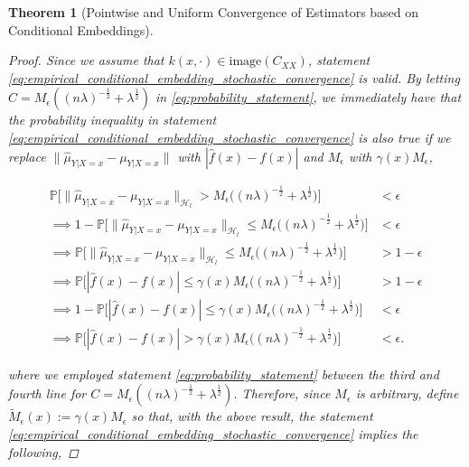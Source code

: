\documentclass{article}
\newtheorem{theorem}{Theorem}[section]
\begin{document}
\begin{theorem}[Pointwise and Uniform Convergence of Estimators based on Conditional Embeddings]
\begin{proof}
			Since we assume that $k(x, \cdot) \in \mathrm{image}(C_{XX})$, statement \eqref{eq:empirical_conditional_embedding_stochastic_convergence} is valid. By letting $C = M_{\epsilon} ((n \lambda)^{-\frac{1}{2}} + \lambda^{\frac{1}{2}})$ in \eqref{eq:probability_statement}, we immediately have that the probability inequality in statement \eqref{eq:empirical_conditional_embedding_stochastic_convergence} is also true if we replace $\| \hat{\mu}_{Y | X = x} - \mu_{Y | X = x} \|$ with $| \hat{f}(x) - f(x) |$ and $M_{\epsilon}$ with $\gamma(x) M_{\epsilon}$,
			
			\begin{equation}
			\begin{aligned}
			\mathbb{P}\Big[\big\| \hat{\mu}_{Y | X = x} - \mu_{Y | X = x} \big\|_{\mathcal{H}_{l}} > M_{\epsilon} \Big((n \lambda)^{-\frac{1}{2}} + \lambda^{\frac{1}{2}}\Big)\Big] &< \epsilon \\
			\implies 1 - \mathbb{P}\Big[\big\| \hat{\mu}_{Y | X = x} - \mu_{Y | X = x} \big\|_{\mathcal{H}_{l}} \leq M_{\epsilon} \Big((n \lambda)^{-\frac{1}{2}} + \lambda^{\frac{1}{2}}\Big)\Big] &< \epsilon \\
			\implies \mathbb{P}\Big[\big\| \hat{\mu}_{Y | X = x} - \mu_{Y | X = x} \big\|_{\mathcal{H}_{l}} \leq M_{\epsilon} \Big((n \lambda)^{-\frac{1}{2}} + \lambda^{\frac{1}{2}}\Big)\Big] &> 1 -  \epsilon \\
			\implies \mathbb{P}\Big[| \hat{f}(x) - f(x) | \leq \gamma(x) M_{\epsilon} \Big((n \lambda)^{-\frac{1}{2}} + \lambda^{\frac{1}{2}}\Big)\Big] &> 1 -  \epsilon \\
			\implies 1 - \mathbb{P}\Big[| \hat{f}(x) - f(x) | \leq \gamma(x) M_{\epsilon} \Big((n \lambda)^{-\frac{1}{2}} + \lambda^{\frac{1}{2}}\Big)\Big] &< \epsilon \\
			\implies \mathbb{P}\Big[| \hat{f}(x) - f(x) | > \gamma(x) M_{\epsilon} \Big((n \lambda)^{-\frac{1}{2}} + \lambda^{\frac{1}{2}}\Big)\Big] &< \epsilon.
			\end{aligned}	
			\end{equation}
			
			where we employed statement \eqref{eq:probability_statement} between the third and fourth line for $C = M_{\epsilon} ((n \lambda)^{-\frac{1}{2}} + \lambda^{\frac{1}{2}})$. Therefore, since $M_{\epsilon}$ is arbitrary, define $\tilde{M}_{\epsilon}(x) := \gamma(x) M_{\epsilon}$ so that, with the above result, the statement \eqref{eq:empirical_conditional_embedding_stochastic_convergence} implies the following,


\end{proof}
\end{theorem}
\end{document}
